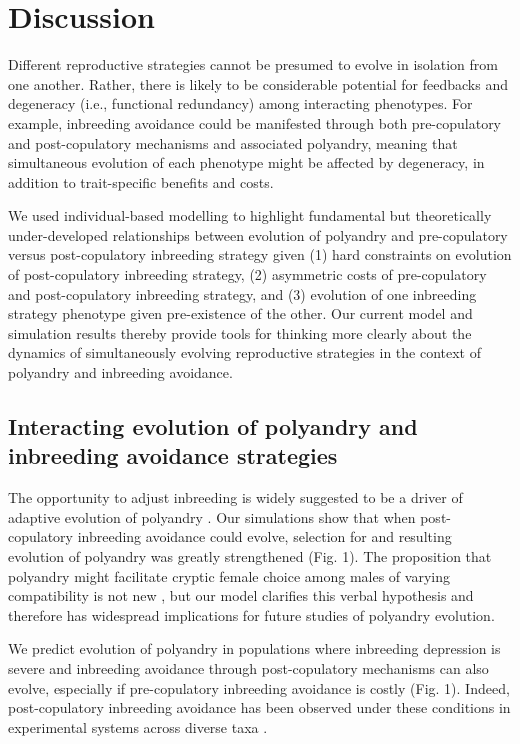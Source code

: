 \documentclass[12pt]{article}
\begin{document}
\section*{Discussion}

Different reproductive strategies cannot be presumed to evolve in isolation from one another. Rather, there is likely to be considerable potential for feedbacks and degeneracy (i.e., functional redundancy) among interacting phenotypes. For example, inbreeding avoidance could be manifested through both pre-copulatory and post-copulatory mechanisms and associated polyandry, meaning that simultaneous evolution of each phenotype might be affected by degeneracy, in addition to trait-specific benefits and costs. 

We used individual-based modelling to highlight fundamental but theoretically under-developed relationships between evolution of polyandry and pre-copulatory versus post-copulatory inbreeding strategy given (1) hard constraints on evolution of post-copulatory inbreeding strategy, (2) asymmetric costs of pre-copulatory and post-copulatory inbreeding strategy, and (3) evolution of one inbreeding strategy phenotype given pre-existence of the other. Our current model and simulation results thereby provide tools for thinking more clearly about the dynamics of simultaneously evolving reproductive strategies in the context of polyandry and inbreeding avoidance.

\subsection*{Interacting evolution of polyandry and inbreeding avoidance strategies}

The opportunity to adjust inbreeding is widely suggested to be a driver of adaptive evolution of polyandry \cite[][]{Tregenza2002, Foerster2003, Akcay2007, Varian-Ramos2012, Kingma2013, Lehtonen2015, Reid2014}. Our simulations show that when post-copulatory inbreeding avoidance could evolve, selection for and resulting evolution of polyandry was greatly strengthened (Fig. 1). The proposition that polyandry might facilitate cryptic female choice among males of varying compatibility is not new \cite[e.g.,][]{Zeh1997, Jennions2000}, but our model clarifies this verbal hypothesis and therefore has widespread implications for future studies of polyandry evolution. 

We predict evolution of polyandry in populations where inbreeding depression is severe and inbreeding avoidance through post-copulatory mechanisms can also evolve, especially if pre-copulatory inbreeding avoidance is costly (Fig. 1). Indeed, post-copulatory inbreeding avoidance has been observed under these conditions in experimental systems across diverse taxa \cite[e.g.,][]{Pizzari2004, Firman2008, Firman2015, Bretman2009, Gasparini2011, Tuni2013}. 
\end{document}
